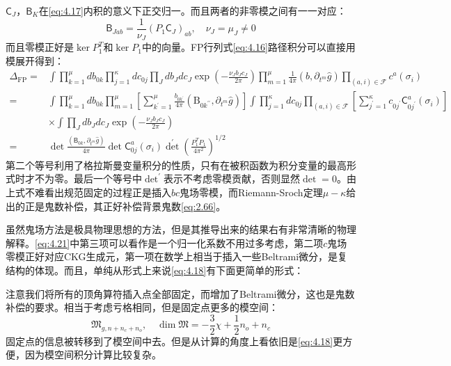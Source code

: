 $\mathsf{C}_J$，$\mathsf{B}_{K}$在\ref{eq:4.17}内积的意义下正交归一。而且两者的非零模之间有一一对应：
\begin{equation}
	\mathsf{B}_{Jab}=\frac{1}{\nu_J}(P_1\mathsf{C}_J)_{ab},\quad\nu_J=\mu_J\neq0
\end{equation}
而且零模正好是$\ker P_1^T$和$\ker{P_1}$中的向量。FP行列式\ref{eq:4.16}路径积分可以直接用模展开得到：
\begin{equation}
	\label{eq:4.21}
	\begin{aligned}
		\Delta_{\text{FP}}=&\int\prod_{k=1}^\mu db_{0k}\prod_{j=1}^\kappa dc_{0j}\prod_Jdb_Jdc_J\exp\left(-\frac{\nu_Jb_Jc_J}{2\pi}\right)\prod_{m=1}^\mu\frac{1}{4\pi}(b,\partial_{t^{m}}\hat{g})\prod_{(a,i)\in\mathcal{F}}c^a(\sigma_i)\\
		=&\int\prod_{k=1}^\mu db_{0k}\prod_{m=1}^\mu\left[\sum_{k^{\prime}=1}^\mu\frac{b_{0k^{\prime}}}{4\pi}\left(\mathrm{B}_{0k^{\prime\prime}},\partial_{t^m}\hat{g}\right)\right]
		\int\prod_{j=1}^\kappa dc_{0j}\prod_{(a,i)\in\mathcal{F}}\left[\sum_{j^{\prime}=1}^\kappa c_{0j^{\prime}}\mathsf{C}_{0j^{\prime}}^a(\sigma_i)\right]
		\\
		&\times\int\prod_Jdb_Jdc_J\exp\left(-\frac{\nu_Jb_Jc_J}{2\pi}\right)\\
		=&\det\frac{(\mathsf{B}_{0k},\partial_{t^m}\hat{g})}{4\pi}{\det}\mathsf{C}_{0j}^a(\sigma_i){\det}^{\prime}\left(\frac{P_1^TP_1}{4\pi^2}\right)^{1/2}
	\end{aligned}
\end{equation}
第二个等号利用了格拉斯曼变量积分的性质，只有在被积函数为积分变量的最高形式时才不为零。最后一个等号中${\det}^\prime$表示不考虑零模贡献，否则显然$\det=0$。由上式不难看出规范固定的过程正是插入$bc$鬼场零模，而Riemann-Sroch定理$\mu-\kappa$给出的正是鬼数补偿，其正好补偿背景鬼数\ref{eq:2.66}。

虽然鬼场方法是极具物理思想的方法，但是其推导出来的结果右有非常清晰的物理解释。\ref{eq:4.21}中第三项可以看作是一个归一化系数不用过多考虑，第二项$c$鬼场零模正好对应CKG生成元，第一项在数学上相当于插入一些Beltrami微分，是复结构的体现。而且，单纯从形式上来说\ref{eq:4.18}有下面更简单的形式：

注意我们将所有的顶角算符插入点全部固定，而增加了Beltrami微分，这也是鬼数补偿的要求。相当于考虑亏格相同，但是固定点更多的模空间：
\begin{equation}
	\mathfrak{M}_{g,n+n_c+n_o},\quad \dim\mathfrak{M} = -\frac32 \chi + \frac12 n_o+n_c
\end{equation}
固定点的信息被转移到了模空间中去。但是从计算的角度上看依旧是\ref{eq:4.18}更方便，因为模空间积分计算比较复杂。

